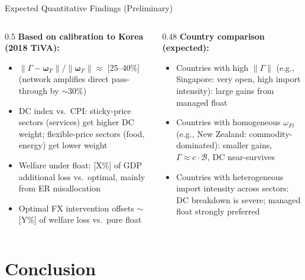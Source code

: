 \documentclass[aspectratio=169]{beamer}
\begin{document}
\begin{frame}{Expected Quantitative Findings (Preliminary)}

\begin{columns}
\begin{column}{0.5\textwidth}
\textbf{Based on calibration to Korea (2018 TiVA):}
\begin{itemize}
    \item $\|\Gamma - \bm{\omega}_F\|/\|\bm{\omega}_F\| \approx $ [25--40\%] \\
    (network amplifies direct pass-through by $\sim$30\%)
    \vspace{0.2cm}
    \item DC index vs.\ CPI: sticky-price sectors (services) get higher DC weight; flexible-price sectors (food, energy) get lower weight
    \vspace{0.2cm}
    \item Welfare under float: [X\%] of GDP additional loss vs.\ optimal, mainly from ER misallocation
    \vspace{0.2cm}
    \item Optimal FX intervention offsets $\sim$[Y\%] of welfare loss vs.\ pure float
\end{itemize}
\end{column}
\begin{column}{0.48\textwidth}
\textbf{Country comparison (expected):}
\begin{itemize}
    \item Countries with high $\|\Gamma\|$ (e.g., Singapore: very open, high import intensity): large gains from managed float
    \vspace{0.2cm}
    \item Countries with homogeneous $\omega_{Fi}$ (e.g., New Zealand: commodity-dominated): smaller gains, $\Gamma \approx c\cdot\mathcal{B}$, DC near-survives
    \vspace{0.2cm}
    \item Countries with heterogeneous import intensity across sectors: DC breakdown is severe; managed float strongly preferred
\end{itemize}
\end{column}
\end{columns}
\end{frame}

\section{Conclusion}
\end{document}
